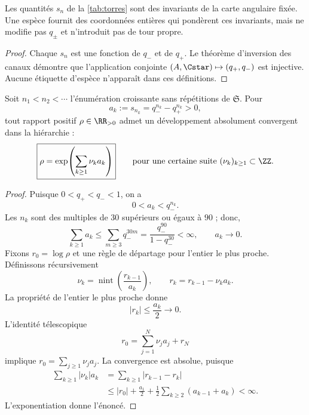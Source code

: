 \begin{proposition}
Les quantités \(s_n\) de la \cref{tab:torres} sont des invariants de la carte angulaire fixée. Une espèce fournit des coordonnées entières qui pondèrent ces invariants, mais ne modifie pas \(q_\pm\) et n'introduit pas de tour propre.
\end{proposition}
\begin{proof}
Chaque \(s_n\) est une fonction de \(q_-\) et de \(q_+\). Le théorème d'inversion des canaux démontre que l'application conjointe \((A,\Cstar)\mapsto(q_+,q_-)\) est injective. Aucune étiquette d'espèce n'apparaît dans ces définitions.
\end{proof}

\begin{theorem}
\label{thm:completitud-reconstructiva-torres} Soit \(n_1<n_2<\cdots\) l'énumération croissante sans répétitions de \(\mathfrak S\). Pour
\[
 a_k:=s_{n_k}=q_-^{n_k}-q_+^{n_k}>0,
\]
tout rapport positif \(\rho\in\RR_{>0}\) admet un développement absolument convergent dans la hiérarchie :
\[
 \boxed{\rho=
 \exp\!\left(\sum_{k\geq1}\nu_k a_k\right)}
 \qquad\text{pour une certaine suite }(\nu_k)_{k\geq1}\subset\ZZ.
\]
\end{theorem}

\begin{proof}
Puisque \(0<q_+<q_-<1\), on a
\[
 0<a_k<q_-^{n_k}.
\]
Les \(n_k\) sont des multiples de \(30\) supérieurs ou égaux à \(90\) ; donc,
\[
 \sum_{k\geq1}a_k
 \leq\sum_{m\geq3}q_-^{30m}
 =\frac{q_-^{90}}{1-q_-^{30}}<\infty,
 \qquad a_k\longrightarrow0.
\]
Fixons \(r_0=\log\rho\) et une règle de départage pour l'entier le plus proche. Définissons récursivement
\[
 \nu_k=\operatorname{nint}\!\left(\frac{r_{k-1}}{a_k}\right),
 \qquad
 r_k=r_{k-1}-\nu_k a_k.
\]
La propriété de l'entier le plus proche donne
\[
 |r_k|\leq\frac{a_k}{2}\longrightarrow0.
\]
L'identité télescopique
\[
 r_0=\sum_{j=1}^{N}\nu_j a_j+r_N
\]
implique \(r_0=\sum_{j\geq1}\nu_j a_j\). La convergence est absolue, puisque
\[
 \begin{aligned}
 \sum_{k\geq1}|\nu_k|a_k
 &=\sum_{k\geq1}|r_{k-1}-r_k|\\
 &\leq |r_0|+\frac{a_1}{2}
 +\frac12\sum_{k\geq2}(a_{k-1}+a_k)<\infty.
 \end{aligned}
\]
L'exponentiation donne l'énoncé.
\end{proof}

